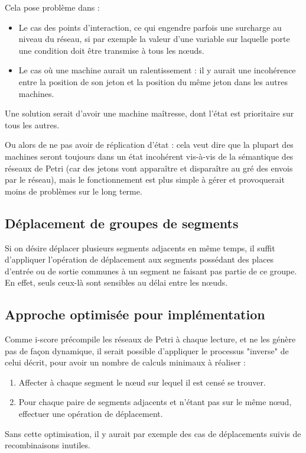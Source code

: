 Cela pose problème dans :
\begin{itemize}
\item Le cas des points d'interaction, ce qui engendre parfois une surcharge au niveau du réseau, si par exemple la valeur d'une variable sur laquelle porte une condition doit être transmise à tous les nœuds.
\item Le cas où une machine aurait un ralentissement : il y aurait une incohérence entre la position de son jeton et la position du même jeton dans les autres machines.
\end{itemize}

Une solution serait d'avoir une machine maîtresse, dont l'état est prioritaire sur tous les autres. 

Ou alors de ne pas avoir de réplication d'état : cela veut dire que la plupart des machines seront toujours dans un état incohérent vis-à-vis de la sémantique des réseaux de Petri (car des jetons vont apparaître et disparaître au gré des envois par le réseau), mais le fonctionnement est plus simple à gérer et provoquerait moins de problèmes sur le long terme.

\subsection{Déplacement de groupes de segments}
Si on désire déplacer plusieurs segments adjacents en même temps, il suffit d'appliquer l'opération de déplacement aux segments possédant des places d'entrée ou de sortie communes à un segment ne faisant pas partie de ce groupe. En effet, seuls ceux-là sont sensibles au délai entre les nœuds.

\subsection{Approche optimisée pour implémentation}
Comme i-score précompile les réseaux de Petri à chaque lecture, et ne les génère pas de façon dynamique, il serait possible d'appliquer le processus "inverse" de celui décrit, pour avoir un nombre de calculs minimaux à réaliser : 

\begin{enumerate}
\item Affecter à chaque segment le nœud sur lequel il est censé se trouver.
\item Pour chaque paire de segments adjacents et n'étant pas sur le même nœud, effectuer une opération de déplacement.
\end{enumerate}

Sans cette optimisation, il y aurait par exemple des cas de déplacements suivis de recombinaisons inutiles.